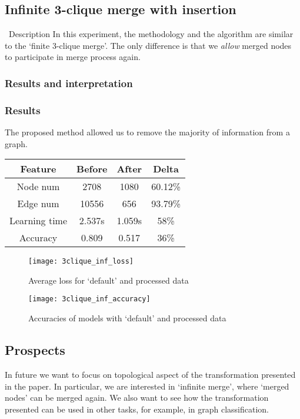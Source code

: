 \subsection{Infinite 3-clique merge with insertion}

\begin{frame}{\subsecname\ Description}
	In this experiment, the methodology and the algorithm are similar to the `finite 3-clique merge'.
	The only difference is that we \emph{allow} merged nodes to participate in merge process again.
\end{frame}

\subsubsection*{Results and interpretation}
\begin{frame}[allowframebreaks]
	\frametitle{Results}
	The proposed method allowed us to remove the majority of information from a graph.

	\centering	
	\begin{tabular}{ |c|c|c|c| }
		\hline
	 	Feature & Before & After & Delta \\
		\hline
		Node num & 2708 & 1080 & 60.12\% \\
		Edge num & 10556 & 656 & 93.79\% \\
		Learning time & 2.537s & 1.059s & 58\% \\
		Accuracy & 0.809 & 0.517 & 36\% \\
	 \hline
	\end{tabular}

	\framebreak

	\begin{figure}[h]
		\centering
		\texttt{[image: 3clique\_inf\_loss]}
		\caption{Average loss for `default' and processed data}
	\end{figure}

	\framebreak

	\begin{figure}[h]
		\centering
		\texttt{[image: 3clique\_inf\_accuracy]}
		\caption{Accuracies of models with `default' and processed data}
	\end{figure}
\end{frame}

\subsection{Prospects}
\begin{frame}{\subsecname}
	In future we want to focus on topological aspect of the transformation presented in the paper.
	In particular, we are interested in `infinite merge', where `merged nodes' can be merged again.
	We also want to see how the transformation presented can be used in other tasks, for example, in graph classification.
\end{frame}

